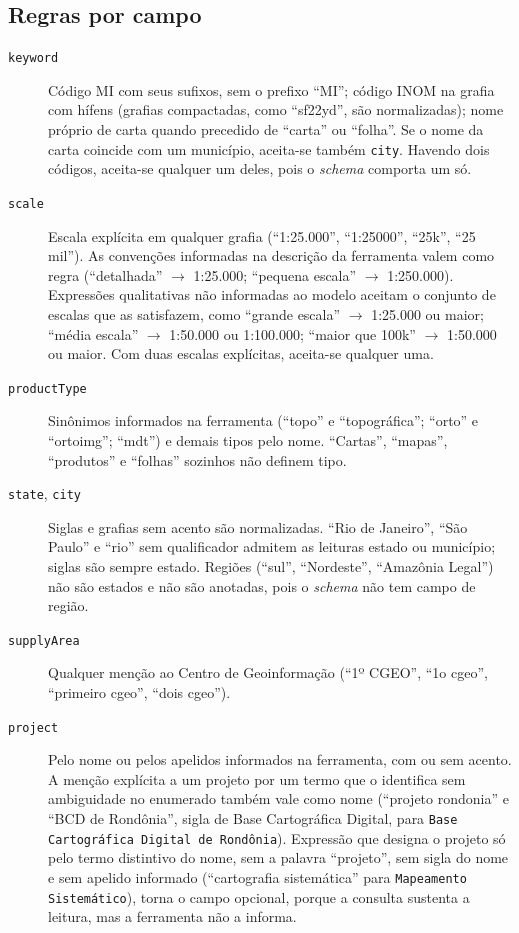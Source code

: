 \subsection*{Regras por campo}

\begin{description}
  \item[\texttt{keyword}] Código MI com seus sufixos, sem o prefixo ``MI''; código INOM na grafia com hífens (grafias compactadas, como ``sf22yd'', são normalizadas); nome próprio de carta quando precedido de ``carta'' ou ``folha''. Se o nome da carta coincide com um município, aceita-se também \texttt{city}. Havendo dois códigos, aceita-se qualquer um deles, pois o \textit{schema} comporta um só.
  \item[\texttt{scale}] Escala explícita em qualquer grafia (``1:25.000'', ``1:25000'', ``25k'', ``25 mil''). As convenções informadas na descrição da ferramenta valem como regra (``detalhada'' $\to$ 1:25.000; ``pequena escala'' $\to$ 1:250.000). Expressões qualitativas não informadas ao modelo aceitam o conjunto de escalas que as satisfazem, como ``grande escala'' $\to$ 1:25.000 ou maior; ``média escala'' $\to$ 1:50.000 ou 1:100.000; ``maior que 100k'' $\to$ 1:50.000 ou maior. Com duas escalas explícitas, aceita-se qualquer uma.
  \item[\texttt{productType}] Sinônimos informados na ferramenta (``topo'' e ``topográfica''; ``orto'' e ``ortoimg''; ``mdt'') e demais tipos pelo nome. ``Cartas'', ``mapas'', ``produtos'' e ``folhas'' sozinhos não definem tipo.
  \item[\texttt{state}, \texttt{city}] Siglas e grafias sem acento são normalizadas. ``Rio de Janeiro'', ``São Paulo'' e ``rio'' sem qualificador admitem as leituras estado ou município; siglas são sempre estado. Regiões (``sul'', ``Nordeste'', ``Amazônia Legal'') não são estados e não são anotadas, pois o \textit{schema} não tem campo de região.
  \item[\texttt{supplyArea}] Qualquer menção ao Centro de Geoinformação (``1º CGEO'', ``1o cgeo'', ``primeiro cgeo'', ``dois cgeo'').
  \item[\texttt{project}] Pelo nome ou pelos apelidos informados na ferramenta, com ou sem acento. A menção explícita a um projeto por um termo que o identifica sem ambiguidade no enumerado também vale como nome (``projeto rondonia'' e ``BCD de Rondônia'', sigla de Base Cartográfica Digital, para \texttt{Base Cartográfica Digital de Rondônia}). Expressão que designa o projeto só pelo termo distintivo do nome, sem a palavra ``projeto'', sem sigla do nome e sem apelido informado (``cartografia sistemática'' para \texttt{Mapeamento Sistemático}), torna o campo opcional, porque a consulta sustenta a leitura, mas a ferramenta não a informa.

\end{description}
